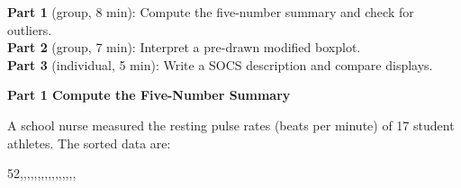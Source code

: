 \documentclass[10pt]{article}
\begin{document}

\vspace{0.10in}

\begin{tcolorbox}[colback=sky, colframe=navy, boxrule=0.8pt, arc=2mm,
    left=3mm, right=3mm, top=2mm, bottom=2mm]
\small
\textbf{Part 1} (group, 8 min): Compute the five-number summary and check for
outliers.\\
\textbf{Part 2} (group, 7 min): Interpret a pre-drawn modified boxplot.\\
\textbf{Part 3} (individual, 5 min): Write a SOCS description and compare
displays.
\end{tcolorbox}

\vspace{0.10in}

{\large\bfseries\color{navy} Part 1 \quad Compute the Five-Number Summary}

\vspace{0.10in}

\noindent\small A school nurse measured the resting pulse rates (beats per minute)
of 17 student athletes. The sorted data are:

\vspace{0.08in}
\begin{center}
\small
52,,,,,,,,,,,,,,,,
\end{center}

\vspace{0.12in}
\end{document}
